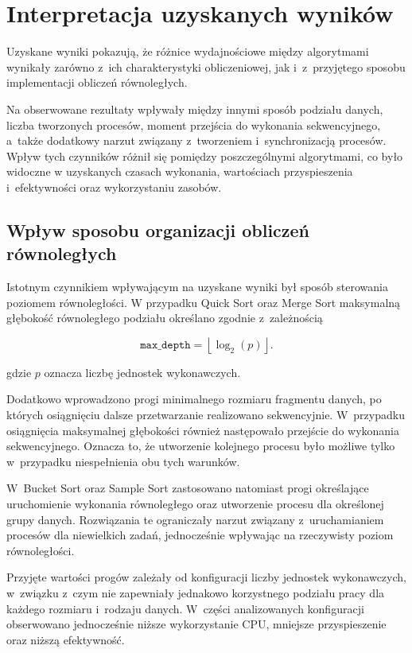 \section{Interpretacja uzyskanych wyników}
\label{sec:InterpretacjaWynikow}

Uzyskane wyniki pokazują, że różnice wydajnościowe między algorytmami wynikały zarówno z~ich charakterystyki obliczeniowej,
jak i~z~przyjętego sposobu implementacji obliczeń równoległych.

Na obserwowane rezultaty wpływały między innymi sposób podziału danych, liczba tworzonych procesów, 
moment przejścia do wykonania sekwencyjnego, a~także dodatkowy narzut związany z~tworzeniem i~synchronizacją procesów.
Wpływ tych czynników różnił się pomiędzy poszczególnymi algorytmami, co było widoczne w uzyskanych czasach wykonania, 
wartościach przyspieszenia i~efektywności oraz wykorzystaniu zasobów.

\subsection*{Wpływ sposobu organizacji obliczeń równoległych}

Istotnym czynnikiem wpływającym na uzyskane wyniki był sposób sterowania poziomem równoległości. 
W przypadku Quick Sort oraz Merge Sort maksymalną głębokość równoległego podziału określano zgodnie z~zależnością

\begin{equation}
    \texttt{max\_depth} = \left\lfloor \log_2(p) \right\rfloor.
\end{equation}

gdzie $p$ oznacza liczbę jednostek wykonawczych. 

Dodatkowo wprowadzono progi minimalnego rozmiaru fragmentu danych, po których osiągnięciu dalsze przetwarzanie realizowano sekwencyjnie. 
W~przypadku osiągnięcia maksymalnej głębokości również następowało przejście do wykonania sekwencyjnego. 
Oznacza to, że utworzenie kolejnego procesu było możliwe tylko w~przypadku niespełnienia obu tych warunków.

W~Bucket Sort oraz Sample Sort zastosowano natomiast progi określające uruchomienie 
wykonania równoległego oraz utworzenie procesu dla określonej grupy danych. 
Rozwiązania te ograniczały narzut związany z~uruchamianiem procesów dla niewielkich zadań, 
jednocześnie wpływając na rzeczywisty poziom równoległości.

Przyjęte wartości progów zależały od konfiguracji liczby jednostek wykonawczych,
w~związku z~czym nie zapewniały jednakowo korzystnego podziału pracy dla każdego rozmiaru i~rodzaju danych.
W~części analizowanych konfiguracji obserwowano jednocześnie niższe wykorzystanie CPU, mniejsze przyspieszenie oraz niższą efektywność.

